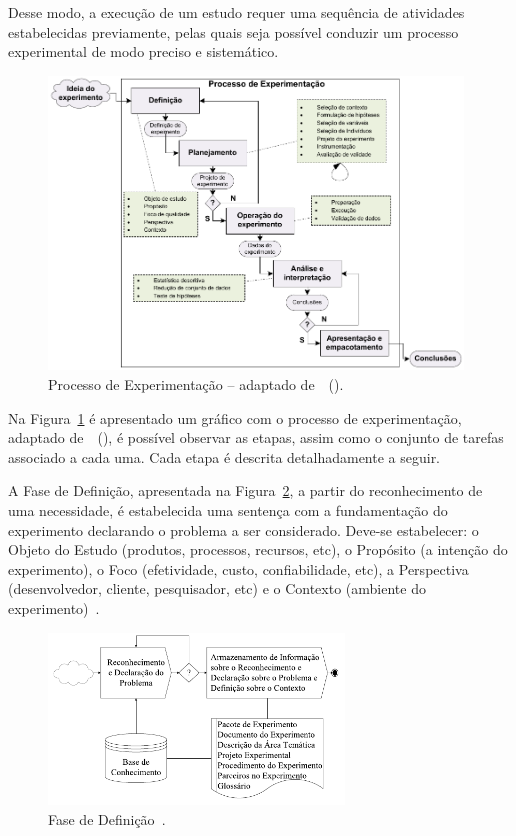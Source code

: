 Desse modo, a execução de um estudo requer uma sequência de atividades estabelecidas previamente, pelas quais seja possível conduzir um processo experimental de modo preciso e sistemático. 

\begin{figure}[!ht]
\centering
\includegraphics[width=0.98\textwidth]{images/Experimentacao.pdf}
\caption{Processo de Experimentação -- adaptado de~~(\citeyear{Wohlin2012}).}
\label{ideia}
\end{figure}

Na Figura~\ref{ideia} é apresentado um gráfico com o processo de experimentação, adaptado de~~(\citeyear{Wohlin2012}), é possível observar as etapas, assim como o conjunto de tarefas associado a cada uma. Cada etapa é descrita detalhadamente a seguir.


A Fase de Definição, apresentada na Figura~\ref{image:definicao}, a partir do reconhecimento de uma necessidade, é estabelecida uma sentença com a fundamentação do experimento declarando o problema a ser considerado. Deve-se estabelecer: o Objeto do Estudo (produtos, processos, recursos, etc), o Propósito (a intenção do experimento), o Foco (efetividade, custo, confiabilidade, etc), a Perspectiva (desenvolvedor, cliente, pesquisador, etc) e o Contexto (ambiente do experimento)~\cite{Garcia06}.

\begin{figure}[!htb]
\centering
\includegraphics[width=0.7\textwidth]{images/definicao.png}
\caption{Fase de Definição~\cite{Garcia06}.}
\label{image:definicao}
\end{figure}

